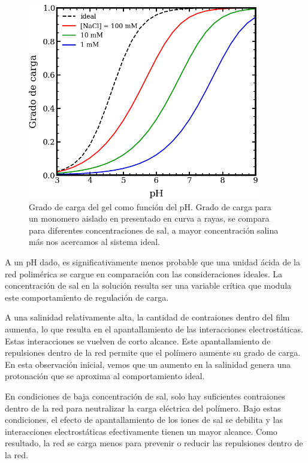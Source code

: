 \begin{figure}
    \centering
    \includegraphics[width=0.9\textwidth]{Figures/graph-film/charge_degree-film.png}
    \caption{Grado de carga del gel como funci\'on del pH. Grado de carga para un monomero aislado en presentado en curva a rayas, se compara para diferentes concentraciones de sal, a mayor concentraci\'on salina m\'as nos acercamos al sistema ideal.}
    \label{fig:film:degree-film}
\end{figure}

A un pH dado, es significativamente menos probable que una unidad \'acida de la red polim\'erica se cargue en comparaci\'on con las consideraciones ideales. La concentraci\'on de sal en la soluci\'on resulta ser una variable cr\'itica que modula este comportamiento de regulaci\'on de carga.

A una salinidad relativamente alta, la cantidad de contraiones dentro del film aumenta, lo que resulta en el apantallamiento de las interacciones electrost\'aticas. Estas interacciones se vuelven de corto alcance. Este apantallamiento de repulsiones dentro de la red permite que el pol\'imero aumente su grado de carga. En esta observaci\'on inicial, vemos que un aumento en la salinidad genera una protonaci\'on que se aproxima al comportamiento ideal.

En condiciones de baja concentraci\'on de sal, solo hay suficientes contraiones dentro de la red para neutralizar la carga el\'ectrica del pol\'imero. Bajo estas condiciones, el efecto de apantallamiento de los iones de sal se debilita y las interacciones electrost\'aticas efectivamente tienen un mayor alcance. Como resultado, la red se carga menos para prevenir o reducir las repulsiones dentro de la red.

